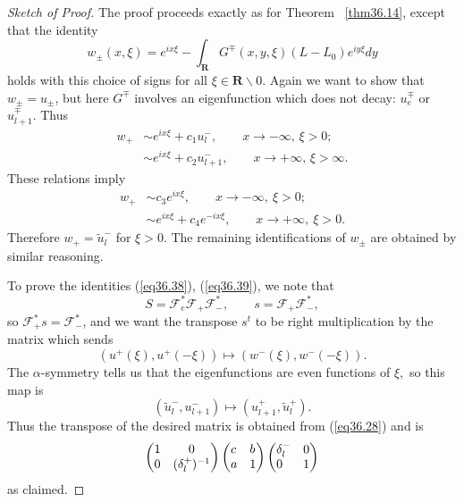\documentclass{surv-l}
\theoremstyle{plain}
\theoremstyle{definition}
\numberwithin{equation}{chapter}
\begin{document}
\begin{proof}[Sketch of Proof] The proof proceeds exactly as for Theorem ~\ref{thm36.14}, except that the identity
\begin{equation}
w_{\pm}(x, \xi)=e^{ix\xi}-\int_{\mathbf{R}}G^{\mp}(x, y,\xi)(L-L_{0})e^{iy\xi}dy
\end{equation}
holds with this choice of signs for all $\xi\in \mathbf{R}\backslash 0$. Again we want to show that $w_{\pm}=u_{\pm}$, but here $ G^{\mp}$ involves an eigenfunction which does not decay: $u_{e}^{\mp}$ or $u_{l+1}^{\mp}$. Thus
\begin{align*}
w_{+}&\sim e^{ix\xi}+c_{1}u_{l}^{-},\qquad x\rightarrow-\infty,\,\xi>0;\\
&\sim e^{ix\xi}+c_{2}u_{l+1}^{-},\qquad x\rightarrow +\infty,\,\xi>\infty.
\end{align*}
These relations imply
\begin{align*}
w_{+}&\sim c_{3}e^{ix\xi},\qquad x\rightarrow-\infty,\ \xi>0;\\
&\sim e^{ix\xi}+c_{4}e^{-ix\xi},\qquad x\rightarrow +\infty,\ \xi>0.
\end{align*}
Therefore $w_{+}=\tilde{u}_{l}^{-}$ for $\xi>0$. The remaining identifications of $w_{\pm}$ are obtained by similar reasoning.

To prove the identities (\ref{eq36.38}), (\ref{eq36.39}), we note that
\begin{equation*}
S=\mathscr{F}_{e}^{*}\mathscr{F}_{+}\mathscr{F}_{-}^{*},\qquad s=\mathscr{F}_{+}\mathscr{F}_{-}^{*},
\end{equation*}
so $\mathscr{F}_{+}^{*}s=\mathscr{F}_{-}^{*}$, and we want the transpose $s^{t}$ to be right multiplication by the matrix which sends
\begin{equation*}
(u^{+}(\xi), u^{+}(-\xi))\mapsto(w^{-}(\xi),w^{-}(-\xi)).
\end{equation*}
The $\alpha$-symmetry tells us that the eigenfunctions are even functions of $\xi,$ so this map is
\begin{equation*}
(\tilde{u}_{l}^{-},u_{l+1}^{-})\mapsto(u_{l+1}^{+},\tilde{u}_{l}^{+}).
\end{equation*}
Thus the transpose of the desired matrix is obtained from (\ref{eq36.28}) and is
\begin{equation}
\left(\begin{array}{@{}cc@{}}
1 & 0\\
0 & (\delta_{l}^{+})^{-1}
\end{array}\right)\left(\begin{array}{@{}ll@{}}
c & b\\
a & 1
\end{array}\right)\left(\begin{array}{@{}ll@{}}
\delta_{l}^{-} & 0\\
0 & 1
\end{array}\right)
\end{equation}
as claimed.
\end{proof}
\end{document}

